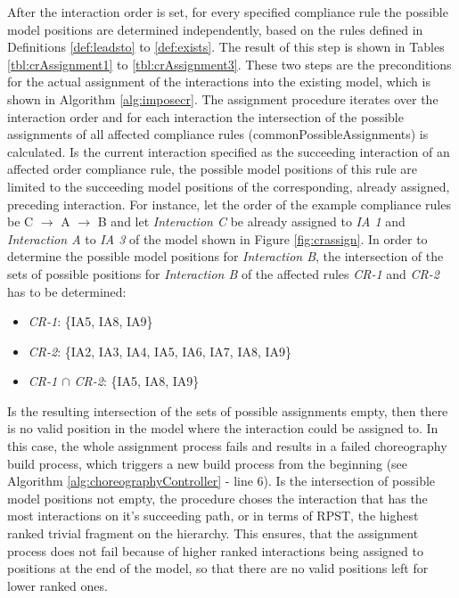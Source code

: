 After the interaction order is set, for every specified compliance rule the possible model positions are determined independently, based on the rules defined in Definitions \ref{def:leadsto} to \ref{def:exists}.  The result of this step is shown in Tables \ref{tbl:crAssignment1} to \ref{tbl:crAssignment3}. These two steps are the preconditions for the actual assignment of the interactions into the existing model, which is shown in Algorithm \ref{alg:imposecr}. The assignment procedure iterates over the interaction order and for each interaction the intersection of the possible assignments of all affected compliance rules (commonPossibleAssignments) is calculated. Is the current interaction specified as the succeeding interaction of an affected order compliance rule, the possible model positions of this rule are limited to the succeeding model positions of the corresponding, already assigned, preceding interaction. For instance, let the order of the example compliance rules be C $\rightarrow$ A $\rightarrow$ B and let \textit{Interaction C} be already assigned to \textit{IA 1} and \textit{Interaction A} to \textit{IA 3} of the model shown in Figure \ref{fig:crassign}. In order to determine the possible model positions for \textit{Interaction B}, the intersection of the sets of possible positions for \textit{Interaction B} of the affected rules \textit{CR-1} and \textit{CR-2} has to be determined: 

\begin{itemize}
\item \textit{CR-1}: \{IA5, IA8, IA9\}
\item \textit{CR-2}: \{IA2, IA3, IA4, IA5, IA6, IA7, IA8, IA9\}
\item \textit{CR-1 $\cap$ CR-2}: \{IA5, IA8, IA9\}
\end{itemize}

Is the resulting intersection of the sets of possible assignments empty, then there is no valid position in the model where the interaction could be assigned to. In this case, the whole assignment process fails and results in a failed choreography build process, which triggers a new build process from the beginning (see Algorithm \ref{alg:choreographyController} - line 6). Is the intersection of possible model positions not empty, the procedure choses the interaction that has the most interactions on it's succeeding path, or in terms of RPST, the highest ranked trivial fragment on the hierarchy. This ensures, that the assignment process does not fail because of higher ranked interactions being assigned to positions at the end of the model, so that there are no valid positions left for lower ranked ones.  

